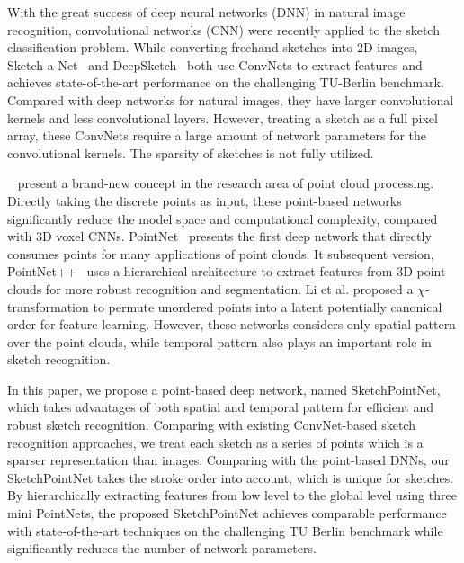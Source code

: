 


With the great success of deep neural networks (DNN) in natural image recognition, convolutional networks (CNN) were recently applied to the sketch classification problem.
%
While converting freehand sketches into 2D images, Sketch-a-Net~\cite{Yu2015SketchaNetTB} and DeepSketch~\cite{Seddati2015DeepSketchDC} both use ConvNets to extract features and achieves state-of-the-art performance on the challenging TU-Berlin benchmark. 
%
Compared with deep networks for natural images, they have larger convolutional kernels and less convolutional layers.
However, treating a sketch as a full pixel array, these ConvNets require a large amount of network parameters for the convolutional kernels. 
The sparsity of sketches is not fully utilized. 

~\cite{qi2017pointnet, qi2017pointnetplusplus, 1801.07791} present a brand-new concept in the research area of point cloud processing.
Directly taking the discrete points as input, these point-based networks significantly reduce the model space and computational complexity, compared with 3D voxel CNNs. 
%
PointNet~\cite{qi2017pointnet} presents the first deep network that directly consumes points for many applications of point clouds. 
It subsequent version, PointNet++~\cite{qi2017pointnetplusplus} uses a hierarchical architecture to extract features from 3D point clouds for more robust recognition and segmentation.
% 
Li et al. \cite{1801.07791} proposed a $\chi$-transformation to permute unordered points into a latent potentially canonical order for feature learning. 
However, these networks considers only spatial pattern over the point clouds, while temporal pattern also plays an important role in sketch recognition. 

 

In this paper, we propose a point-based deep network, named SketchPointNet, which takes advantages of both spatial and temporal pattern for efficient and robust sketch recognition. 
%
Comparing with existing ConvNet-based sketch recognition approaches, we treat each sketch as a series of points which is a sparser representation than images. 
Comparing with the point-based DNNs, our SketchPointNet takes the stroke order into account,  which is unique for sketches. 
%
By hierarchically extracting features from low level to the global level using three mini PointNets, the proposed SketchPointNet achieves comparable performance with state-of-the-art techniques on the challenging TU Berlin benchmark while significantly reduces the number of network parameters. 


